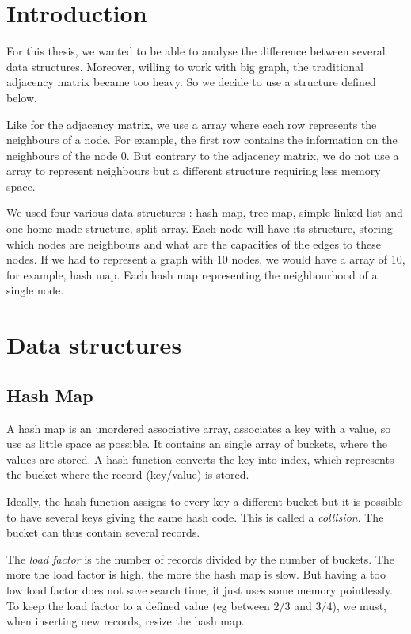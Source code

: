 \section{Introduction}
For this thesis, we wanted to be able to analyse the difference between several data structures. Moreover, willing to work with big graph, the traditional adjacency matrix became too heavy. So we decide to use a structure defined below. \newline

Like for the adjacency matrix, we use a array where each row represents the neighbours of a node. For example, the first row contains the information on the neighbours of the node 0. But contrary to the adjacency matrix, we do not use a array to represent neighbours but a different structure requiring less memory space. \newline

We used four various data structures : hash map, tree map, simple linked list and one home-made structure, split array. Each node will have its structure, storing which nodes are neighbours and what are the capacities of the edges to these nodes. If we had to represent a graph with 10 nodes, we would have a array of 10, for example, hash map. Each hash map representing the neighbourhood of a single node.

\section{Data structures}
\subsection{Hash Map}
A hash map is an unordered associative array, associates a key with a value, so use as little space as possible. It contains an single array of buckets, where the values are stored. A hash function converts the key into index, which represents the bucket where the record (key/value) is stored. \newline

Ideally, the hash function assigns to every key a different bucket but it is possible to have several keys giving the same hash code. This is called a \textit{collision}. The bucket can thus contain several records. \newline

The \textit{load factor} is the number of records divided by the number of buckets.  The more the load factor is high, the more the hash map is slow. But having a too low load factor does not save search time, it just uses some memory pointlessly. To keep the load factor to a defined value (eg between $2/3$ and $3/4$), we must, when inserting new records, resize the hash map. \newline

